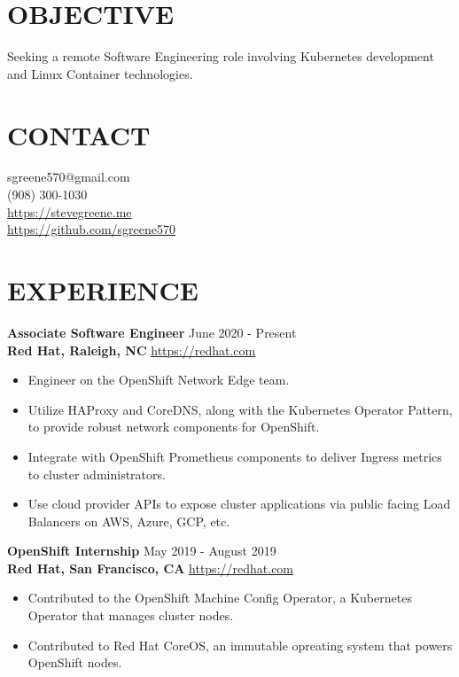 \documentclass[line, margin, 11pt]{res}
\begin{document}

\begin{resume}

\section{\small OBJECTIVE}
Seeking a remote Software Engineering role involving Kubernetes development and Linux Container technologies.

\section{\small CONTACT}
sgreene570@gmail.com \\
(908) 300-1030 \\
\url{https://stevegreene.me} \\
\url{https://github.com/sgreene570}

\section{\small EXPERIENCE}
{\bf \large{Associate Software Engineer}} \hfill June 2020 - Present \\
{\bf Red Hat, Raleigh, NC} \hfill \url{https://redhat.com}
\begin{itemize}
    \item Engineer on the OpenShift Network Edge team.
    \item Utilize HAProxy and CoreDNS, along with the Kubernetes Operator Pattern, to provide robust network components for OpenShift.
    \item Integrate with OpenShift Prometheus components to deliver Ingress metrics to cluster administrators.
    \item Use cloud provider APIs to expose cluster applications via public facing Load Balancers on AWS, Azure, GCP, etc.
\end{itemize}


{\bf \large{OpenShift Internship}} \hfill May 2019 - August 2019 \\
{\bf Red Hat, San Francisco, CA} \hfill \url{https://redhat.com}
\begin{itemize}
    \item Contributed to the OpenShift Machine Config Operator, a Kubernetes Operator that manages cluster nodes.
    \item Contributed to Red Hat CoreOS, an immutable opreating system that powers OpenShift nodes.
\end{itemize}



\end{resume}
\end{document}
